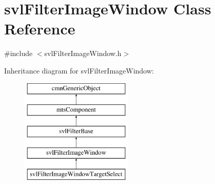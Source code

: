 \hypertarget{classsvl_filter_image_window}{\section{svl\-Filter\-Image\-Window Class Reference}
\label{classsvl_filter_image_window}
}


{\ttfamily \#include $<$svl\-Filter\-Image\-Window.\-h$>$}

Inheritance diagram for svl\-Filter\-Image\-Window\-:\begin{figure}[H]
\begin{center}
\leavevmode
\includegraphics[height=5.000000cm]{d3/db2/classsvl_filter_image_window}
\end{center}
\end{figure}
